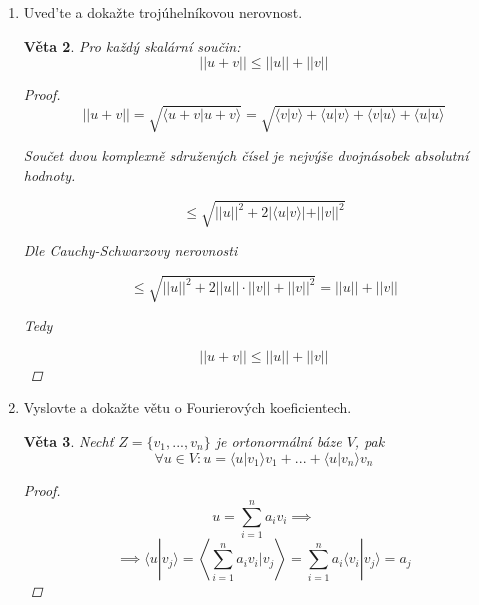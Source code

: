\documentclass[10pt,a4paper]{article}
\theoremstyle{plain}
\newtheorem{veta}{Věta}
\begin{document}
\begin{enumerate}
\begin{veta}
\begin{proof}
Pro odečtení posledních dvou členů zvolme $a = - \frac{\langle u|v \rangle}{\langle v|v \rangle}$

Dostaneme 
\begin{align*}
0 &\leq \langle u|u \rangle  - \frac{\langle u|v \rangle}{\langle v|v \rangle} \langle v|u \rangle \\
 \frac{\langle u|v \rangle}{\langle v|v \rangle} \langle v|u \rangle  &\leq \langle u|u \rangle \\
 \langle u|v \rangle \langle v|u \rangle  &\leq \langle u|u \rangle  \langle v|v \rangle \\
 \langle u|v \rangle^2   &\leq ||u||^2 \cdot ||v||^2 \\
  \langle u|v \rangle   &\leq ||u|| \cdot ||v|| 
\end{align*}

\end{proof}
\end{veta}

\item Uved'te a dokažte trojúhelníkovou nerovnost.
\begin{veta}
Pro každý skalární součin:
\[ ||u+v|| \leq ||u|| + ||v|| \]
\begin{proof}
\[  ||u+v||  = \sqrt{\langle u +v | u + v \rangle} =
 \sqrt{\langle v | v \rangle + \langle u | v \rangle + \langle v | u \rangle + \langle u | u \rangle}\]
 
Součet dvou komplexně sdružených čísel je nejvýše dvojnásobek absolutní hodnoty.
 
 \[ \leq  \sqrt{||u||^2 + 2 |\langle u | v \rangle | +  ||v||^2}   \]
 
 Dle Cauchy-Schwarzovy nerovnosti
 
  \[ \leq  \sqrt{||u||^2 + 2 ||u|| \cdot ||v|| +  ||v||^2} = ||u|| + ||v||  \]
  
  Tedy 
  
  \[ ||u+v|| \leq ||u|| + ||v||  \]
\end{proof}
\end{veta}

\item Vyslovte a dokažte větu o Fourierových koeficientech.
\begin{veta}
Nechť $Z = \{v_1, ..., v_n\}$ je ortonormální báze $V$, pak
\[\forall u \in V: u = \langle u | v_1 \rangle v_1 + ... +  \langle u | v_n \rangle v_n \]
\begin{proof}
\[ u = \sum^n_{i=1} a_i v_i \implies\]
\[\implies  \langle u | v_j \rangle =  \left\langle \sum^n_{i=1} a_i v_i  | v_j \right\rangle = \sum^n_{i=1} a_i \langle  v_i  | v_j \rangle = a_j \]
\end{proof}
\end{veta}



\end{enumerate}
\end{document}
